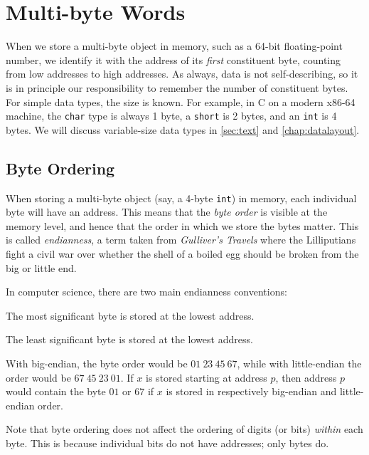 \section{Multi-byte Words}

When we store a multi-byte object in memory, such as a 64-bit
floating-point number, we identify it with the address of its
\emph{first} constituent byte, counting from low addresses to high
addresses.  As always, data is not self-describing, so it is in
principle our responsibility to remember the number of constituent
bytes.  For simple data types, the size is known.  For example, in C
on a modern x86-64 machine, the \texttt{char} type is always 1 byte, a
\texttt{short} is 2 bytes, and an \texttt{int} is 4 bytes.  We will
discuss variable-size data types in \cref{sec:text} and
\cref{chap:datalayout}.

\subsection{Byte Ordering}
\label{sec:endianness}

When storing a multi-byte object (say, a 4-byte \texttt{int}) in
memory, each individual byte will have an address.  This means that
the \emph{byte order} is visible at the memory level, and hence that
the order in which we store the bytes matter.  This is called
\emph{endianness}, a term taken from \emph{Gulliver's Travels} where
the Lilliputians fight a civil war over whether the shell of a boiled
egg should be broken from the big or little end.

In computer science, there are two main endianness conventions:
\begin{definition}
  The most significant byte is stored at the lowest address.
\end{definition}
\begin{definition}
  The least significant byte is stored at the lowest address.
\end{definition}

\begin{example}[Representing $x=01234567_{16}$ in memory]
  With big-endian, the byte order would be $01~23~45~67$, while with
  little-endian the order would be $67~45~23~01$.  If $x$ is stored
  starting at address $p$, then address $p$ would contain the byte
  $01$ or $67$ if $x$ is stored in respectively big-endian
  and little-endian order.
\end{example}

Note that byte ordering does not affect the ordering of digits (or
bits) \emph{within} each byte.  This is because individual bits do not
have addresses; only bytes do.

